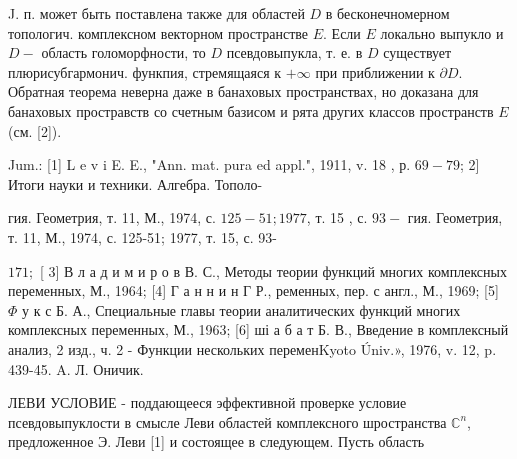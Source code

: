 \documentclass[10pt]{article}
\begin{document}
J. п. может быть поставлена также для областей $D$ в бесконечномерном топологич. комплексном векторном пространстве $E$. Если $E$ локально выпукло и $D-$ область голоморфности, то $D$ псевдовыпукла, т. е. в $D$ существует плюрисубгармонич. функпия, стремящаяся к $+\infty$ при приближении к $\partial D$. Обратная теорема неверна даже в банаховых пространствах, но доказана для банаховых простравств со счетным базисом и рята других классов пространств $E$ (см. [2]).



Jum.: [1] L e v i E. E., "Ann. mat. pura ed appl.", 1911, v. 18 , р. $69-79$; 2] Итоги науки и техники. Алгебра. Тополо-

гия. Геометрия, т. 11, М., 1974, с. $125-51 ; 1977$, т. 15 , с. $93-$ гия. Геометрия, т. 11, М., 1974, с. 125-51; 1977, т. 15, с. 93-

$171 ;$ [ 3$]$ В л а д и м и р о в В. С., Методы теории функций многих комплексных переменных, М., 1964; [4] Г а н н и н Г Р., ременных, пер. с англ., М., 1969; [5] $\Phi$ у к с Б. А., Специальные главы теории аналитических функций многих комплексных переменных, М., 1963; [6] ші а б а т Б. В., Введение в комплексный анализ, 2 изд., ч. 2 - Функции нескольких переменKyoto Úniv.», 1976, v. 12, p. 439-45. A. Л. Оничик.



ЛЕВИ УСЛОВИЕ - поддающееся эффективной проверке условие псевдовыпуклости в смысле Леви областей комплексного шространства $\mathbb{C}^{n}$, предложенное Э. Леви [1] и состоящее в следующем. Пусть область
\end{document}

